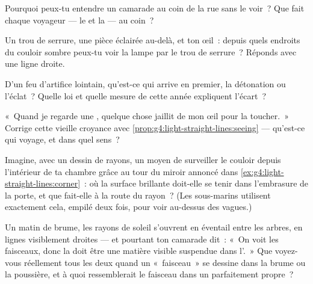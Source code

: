 \begin{exercise}[$\star$]\label{exo:g4:light-straight-lines:6}
Pourquoi peux-tu entendre un camarade au coin de la rue sans le
voir~? Que fait chaque voyageur --- le  et la  --- au coin~?
\end{exercise}

\begin{exercise}[$\star$]\label{exo:g4:light-straight-lines:7}
Un trou de serrure, une pièce éclairée au-delà, et ton œil~: depuis
quels endroits du couloir sombre peux-tu voir la lampe par le trou de
serrure~? Réponds avec une ligne droite.
\end{exercise}

\begin{exercise}[$\star$]\label{exo:g4:light-straight-lines:8}
D'un feu d'artifice lointain, qu'est-ce qui arrive en premier, la
détonation ou l'éclat~? Quelle loi et quelle mesure de cette année
expliquent l'écart~?
\end{exercise}

\begin{exercise}[$\star$]\label{exo:g4:light-straight-lines:9}
«~Quand je regarde une , quelque chose jaillit de mon œil pour
la toucher.~» Corrige cette vieille croyance avec
\cref{prop:g4:light-straight-lines:seeing} --- qu'est-ce qui voyage,
et dans quel sens~?
\end{exercise}

\begin{exercise}[$\star\star$]\label{exo:g4:light-straight-lines:10}
Imagine, avec un dessin de rayons, un moyen de surveiller le couloir
depuis l'intérieur de ta chambre grâce au tour du miroir annoncé dans
\cref{ex:g4:light-straight-lines:corner}~: où la surface brillante
doit-elle se tenir dans l'embrasure de la porte, et que fait-elle à
la route du rayon~? (Les sous-marins utilisent exactement cela,
empilé deux fois, pour voir au-dessus des vagues.)
\end{exercise}

\begin{exercise}[$\star\star$]\label{exo:g4:light-straight-lines:11}
Un matin de brume, les rayons de soleil s'ouvrent en éventail entre
les arbres, en lignes visiblement droites --- et pourtant ton
camarade dit~: «~On voit les faisceaux, donc la  doit être une
matière visible suspendue dans l'.~» Que voyez-vous réellement
tous les deux quand un «~faisceau~» se dessine dans la brume ou la
poussière, et à quoi ressemblerait le faisceau dans un 
parfaitement propre~?
\end{exercise}
